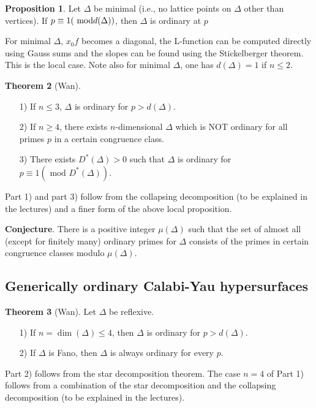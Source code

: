 \documentclass[a4paper,oneside,11pt]{article}
\theoremstyle{plain} \theoremstyle{definition}
\newtheorem{Thm}{Theorem}[section]
\newtheorem{Prop}[Thm]{Proposition}
\theoremstyle{remark}
\newcommand{\Mod}{\text{ mod }}
\begin{document}
\begin{Prop} Let $\Delta$ be minimal (i.e., no lattice points on 
$\Delta$ other than vertices). If $p \equiv 1 (~{\rm mod} d(\Delta))$, 
then $\Delta$ is ordinary at $p$
\end{Prop}

For minimal $\Delta$, $x_0f$ becomes a diagonal, 
the L-function can be computed directly using Gauss sums 
and the slopes can be found using the Stickelberger theorem. 
This is the local case. Note also for minimal $\Delta$, 
one has $d(\Delta)=1$ if $n\leq 2$. 


\begin{Thm}[Wan] \begin{enumerate}\item[1)] If $n\le 3$,
$\Delta$ is ordinary for $p>d(\Delta)$. \item[2)]If $n\ge
4$, there exists $n$-dimensional $\Delta$ which is NOT ordinary for all primes
$p$ in a certain congruence class.
\item[3)]There exists $D^*(\Delta)>0$ such that $\Delta$ is
ordinary for $p\equiv 1(\Mod D^*(\Delta))$.
\end{enumerate}
\end{Thm}


Part 1) and part 3) follow from the 
collapsing decomposition (to be explained in the lectures) and a finer form of 
the above local proposition. 


{\bf Conjecture}. There is a positive integer $\mu(\Delta)$ such that the set
of almost all (except for finitely many) ordinary primes for $\Delta$
consists of the primes in certain congruence classes modulo $\mu(\Delta)$.



\subsection{Generically ordinary Calabi-Yau hypersurfaces}

\begin{Thm}[Wan] Let $\Delta$ be reflexive.
\begin{enumerate}\item[1)]If $n=\dim(\Delta)\le 4$, then $\Delta$ is
ordinary for $p>d(\Delta)$.\item[2)]If $\Delta$ is Fano, then
$\Delta$ is always ordinary for every $p$.\end{enumerate}
\end{Thm}

Part 2) follows from the star decomposition theorem. The case $n=4$ of 
Part 1) follows from a combination of the star decomposition and the 
collapsing decomposition (to be explained in the lectures). 
\end{document}
